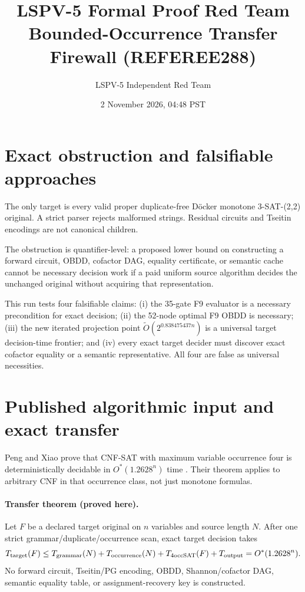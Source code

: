\documentclass[11pt]{article}
\title{LSPV-5 Formal Proof Red Team\\Bounded-Occurrence Transfer Firewall (REFEREE288)}
\author{LSPV-5 Independent Red Team}
\date{2 November 2026, 04:48 PST}
\begin{document}
\maketitle

\begin{center}
\end{center}

\section{Exact obstruction and falsifiable approaches}
The only target is every valid proper duplicate-free D\"ocker monotone
3-SAT-(2,2) original.  A strict parser rejects malformed strings.  Residual
circuits and Tseitin encodings are not canonical children.

The obstruction is quantifier-level: a proposed lower bound on constructing a
forward circuit, OBDD, cofactor DAG, equality certificate, or semantic cache
cannot be necessary decision work if a paid uniform source algorithm decides
the unchanged original without acquiring that representation.

This run tests four falsifiable claims: (i) the 35-gate F9 evaluator is a
necessary precondition for exact decision; (ii) the 52-node optimal F9 OBDD is
necessary; (iii) the new iterated projection point
$\widetilde O(2^{0.838475437n})$ is a universal target decision-time frontier;
and (iv) every exact target decider must discover exact cofactor equality or a
semantic representative.  All four are false as universal necessities.

\section{Published algorithmic input and exact transfer}
Peng and Xiao prove that CNF-SAT with maximum variable occurrence four is
deterministically decidable in $O^*(1.2628^n)$ time
\cite{pengxiao23,pengxiao25}.  Their theorem applies to arbitrary CNF in that
occurrence class, not just monotone formulas.

\paragraph{Transfer theorem (proved here).}
Let $F$ be a declared target original on $n$ variables and source length $N$.
After one strict grammar/duplicate/occurrence scan, exact target decision takes
\[
 T_{\rm target}(F)\le T_{\rm grammar}(N)+T_{\rm occurrence}(N)
       +T_{4\rm occSAT}(F)+T_{\rm output}
       =O^*(1.2628^n).
\]
No forward circuit, Tseitin/PG encoding, OBDD, Shannon/cofactor DAG, semantic
equality table, or assignment-recovery key is constructed.
\end{document}
